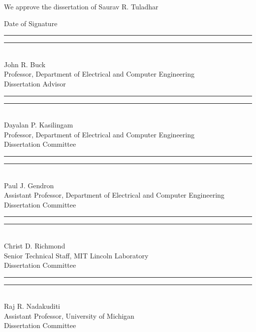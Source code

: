 \enlargethispage{3cm}
\newenvironment{changemargin}[2]{%
  \begin{list}{}{%
       \setlength{\textwidth}{6in} %
       \setlength{\voffset}{0.5in}  %
       \setlength{\marginparsep}{0in}
       \setlength{\topmargin}{0in}%
       \setlength{\headheight}{0in}
       \setlength{\headsep}{0in}
       \setlength{\footskip}{0in}
       \setlength{\footnotesep}{0in}
       \setlength{\rightmargin}{#2}%
       \setlength{\leftmargin}{#1}%
    }%
  \item[]}{\end{list}}
\thispagestyle{empty}
\newcommand{\titlesep}{0.15in}
\singlespacing
\begin{changemargin}{0in}{0in}
  \begin{flushleft}
    \normalsize
    We approve the dissertation of Saurav R. Tuladhar \par
    \vskip 0.05in
    \hspace{4.45in} Date of Signature
    \vskip 0.1in
    \rule{0.55\textwidth}{0.5pt} \hfill \rule{1.4in}{0.5pt} \\
    John R. Buck \\ Professor, Department of Electrical and Computer Engineering \\ Dissertation Advisor

    \vskip \titlesep    
    \rule{0.55\textwidth}{0.5pt} \hfill \rule{1.4in}{0.5pt} \\ 
    Dayalan P. Kasilingam \\ Professor, Department of Electrical and Computer Engineering \\ Dissertation Committee 
    
    \vskip\titlesep
    \rule{0.55\textwidth}{0.5pt} \hfill \rule{1.4in}{0.5pt} \\
    Paul J. Gendron \\ Assistant Professor, Department of Electrical and Computer Engineering \\ Dissertation Committee

    \vskip\titlesep
    \rule{0.55\textwidth}{0.5pt} \hfill \rule{1.4in}{0.5pt} \\
    Christ D. Richmond \\ Senior Technical Staff, MIT Lincoln Laboratory    \\ Dissertation Committee 

    \vskip\titlesep
    \rule{0.55\textwidth}{0.5pt} \hfill \rule{1.4in}{0.5pt} \\
    Raj R. Nadakuditi \\ Assistant Professor, University of Michigan \\ Dissertation Committee 


\end{flushleft}
\end{changemargin}
